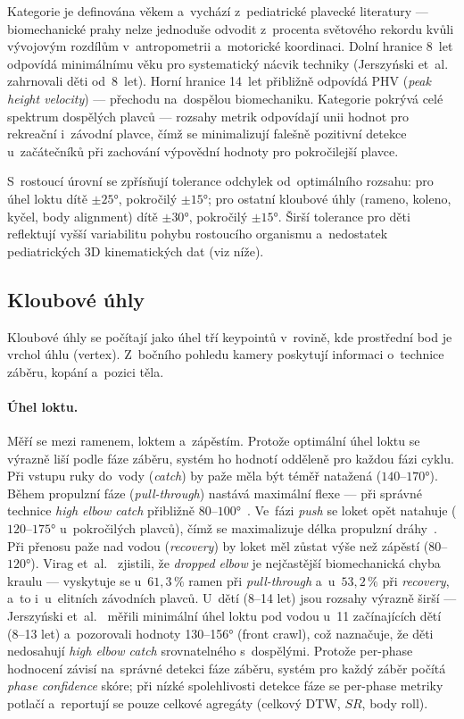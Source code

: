 Kategorie  je definována věkem a~vychází z~pediatrické plavecké literatury --- biomechanické prahy nelze jednoduše odvodit z~procenta světového rekordu kvůli vývojovým rozdílům v~antropometrii a~motorické koordinaci. Dolní hranice 8~let odpovídá minimálnímu věku pro systematický nácvik techniky (Jerszyński et~al.~\cite{jerszynski2013} zahrnovali děti od~8~let). Horní hranice 14~let přibližně odpovídá PHV (\textit{peak height velocity}) --- přechodu na~dospělou biomechaniku. Kategorie  pokrývá celé spektrum dospělých plavců --- rozsahy metrik odpovídají unii hodnot pro rekreační i~závodní plavce, čímž se minimalizují falešně pozitivní detekce u~začátečníků při zachování výpovědní hodnoty pro pokročilejší plavce.

S~rostoucí úrovní se zpřísňují tolerance odchylek od~optimálního rozsahu: pro úhel loktu dítě $\pm 25°$, pokročilý $\pm 15°$; pro ostatní kloubové úhly (rameno, koleno, kyčel, body alignment) dítě $\pm 30°$, pokročilý $\pm 15°$. Širší tolerance pro děti reflektují vyšší variabilitu pohybu rostoucího organismu a~nedostatek pediatrických 3D kinematických dat (viz níže).

\subsection{Kloubové úhly}
\label{subsec:kloubove_uhly}

Kloubové úhly se počítají jako úhel tří keypointů v~rovině, kde prostřední bod je vrchol úhlu (vertex). Z~bočního pohledu kamery poskytují informaci o~technice záběru, kopání a~pozici těla.

\paragraph{Úhel loktu.} Měří se mezi ramenem, loktem a~zápěstím. Protože optimální úhel loktu se výrazně liší podle fáze záběru, systém ho hodnotí odděleně pro každou fázi cyklu. Při vstupu ruky do~vody (\textit{catch}) by paže měla být téměř natažená ($140$--$170°$). Během propulzní fáze (\textit{pull-through}) nastává maximální flexe --- při správné technice \textit{high elbow catch} přibližně $80$--$100°$~\cite{maglischo2003}. Ve~fázi \textit{push} se loket opět natahuje ($120$--$175°$ u~pokročilých plavců), čímž se maximalizuje délka propulzní dráhy~\cite{cappaert1996}. Při přenosu paže nad vodou (\textit{recovery}) by loket měl zůstat výše než zápěstí ($80$--$120°$). Virag et~al.~\cite{virag2014} zjistili, že \textit{dropped elbow} je nejčastější biomechanická chyba kraulu --- vyskytuje se u~$61{,}3\,\%$ ramen při \textit{pull-through} a~u~$53{,}2\,\%$ při \textit{recovery}, a~to i~u~elitních závodních plavců. U~dětí (8--14 let) jsou rozsahy výrazně širší --- Jerszyński et~al.~\cite{jerszynski2013} měřili minimální úhel loktu pod vodou u~11 začínajících dětí (8--13 let) a~pozorovali hodnoty 130--156° (front crawl), což naznačuje, že děti nedosahují \textit{high elbow catch} srovnatelného s~dospělými. Protože per-phase hodnocení závisí na~správné detekci fáze záběru, systém pro každý záběr počítá \textit{phase confidence} skóre; při nízké spolehlivosti detekce fáze se per-phase metriky potlačí a~reportují se pouze celkové agregáty (celkový DTW, $SR$, body roll).


